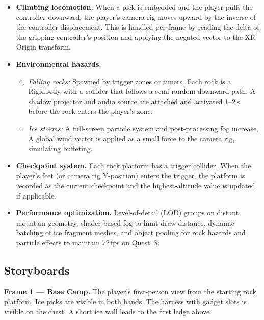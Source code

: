 \documentclass[12pt]{article}
\begin{document}
\begin{itemize}[leftmargin=2em]
    \item \textbf{Climbing locomotion.} When a pick is embedded and the player pulls the controller downward, the player's camera rig moves upward by the inverse of the controller displacement. This is handled per-frame by reading the delta of the gripping controller's position and applying the negated vector to the XR Origin transform.

    \item \textbf{Environmental hazards.}
    \begin{itemize}
        \item \emph{Falling rocks:} Spawned by trigger zones or timers. Each rock is a Rigidbody with a collider that follows a semi-random downward path. A shadow projector and audio source are attached and activated 1--2\,s before the rock enters the player's zone.
        \item \emph{Ice storms:} A full-screen particle system and post-processing fog increase. A global wind vector is applied as a small force to the camera rig, simulating buffeting.
    \end{itemize}

    \item \textbf{Checkpoint system.} Each rock platform has a trigger collider. When the player's feet (or camera rig Y-position) enters the trigger, the platform is recorded as the current checkpoint and the highest-altitude value is updated if applicable.

    \item \textbf{Performance optimization.} Level-of-detail (LOD) groups on distant mountain geometry, shader-based fog to limit draw distance, dynamic batching of ice fragment meshes, and object pooling for rock hazards and particle effects to maintain 72\,fps on Quest~3.
\end{itemize}

\subsection{Storyboards}


\textbf{Frame 1 --- Base Camp.} The player's first-person view from the starting rock platform. Ice picks are visible in both hands. The harness with gadget slots is visible on the chest. A short ice wall leads to the first ledge above.
\end{document}
